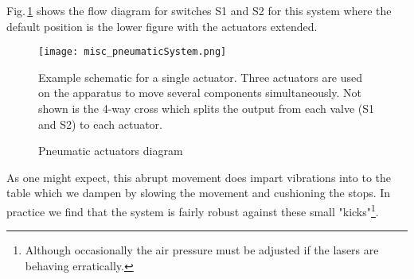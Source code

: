 Fig.\,\ref{fig:pnuSys} shows the flow diagram for switches S1 and S2 for this system where the default position is the lower figure with the actuators extended.
	\begin{figure}
		\centerline{
		\texttt{[image: misc\_pneumaticSystem.png]}}
		\caption{Pneumatic actuators diagram}{Example schematic for a single actuator. Three actuators are used on the apparatus to move several components simultaneously. Not shown is the 4-way cross which splits the output from each valve (S1 and S2) to each actuator.}
		\label{fig:pnuSys}
	\end{figure}
As one might expect, this abrupt movement does impart vibrations into to the table which we dampen by slowing the movement and cushioning the stops.
In practice we find that the system is fairly robust against these small "kicks"\footnote{Although occasionally the air pressure must be adjusted if the lasers are behaving erratically.}.
